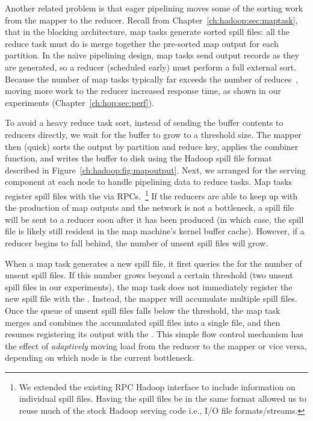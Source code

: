Another related problem is that eager pipelining moves some of the sorting work
from the mapper to the reducer.  Recall from
Chapter~\ref{ch:hadoop:sec:maptask}, that in the blocking architecture, map
tasks generate sorted spill files: all the reduce task must do is merge
together the pre-sorted map output for each partition.  In the na\"{\i}ve
pipelining design, map tasks send output records as they are generated, so a
reducer (scheduled early) must perform a full external sort.  Because the
number of map tasks typically far exceeds the number of
reduces~\cite{mapreduce-osdi}, moving more work to the reducer increased
response time, as shown in our experiments (Chapter~\ref{ch:hop:sec:perf}).

To avoid a heavy reduce task sort, instead of sending the buffer contents to
reducers directly, we wait for the buffer to grow to a threshold size.  The
mapper then (quick) sorts the output by partition and reduce key, applies the
combiner function, and writes the buffer to disk using the Hadoop spill file
format described in Figure~\ref{ch:hadoop:fig:mapoutput}.  Next, we arranged
for the {\TT} serving component at each node to handle pipelining data to
reduce tasks.  Map tasks register spill files with the {\TT} via
RPCs.~\footnote{We extended the existing RPC Hadoop interface to include
information on individual spill files.  Having the spill files be in the same
format allowed us to reuse much of the stock Hadoop serving code i.e., I/O file
formats/streams.}  If the reducers are able to keep up with the production of
map outputs and the network is not a bottleneck, a spill file will be sent to a
reducer soon after it has been produced (in which case, the spill file is
likely still resident in the map machine's kernel buffer cache).  However, if a
reducer begins to fall behind, the number of unsent spill files will grow.

When a map task generates a new spill file, it first queries the {\TT} for the
number of unsent spill files.  If this number grows beyond a certain threshold
(two unsent spill files in our experiments), the map task does not immediately
register the new spill file with the {\TT}.  Instead, the mapper will
accumulate multiple spill files.  Once the queue of unsent spill files falls
below the threshold, the map task merges and combines the accumulated spill
files into a single file, and then resumes registering its output with the
{\TT}.  This simple flow control mechanism has the effect of {\em adaptively}
moving load from the reducer to the mapper or vice versa, depending on which
node is the current bottleneck.

